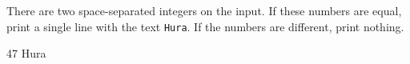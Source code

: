 




There are two space-separated integers on the input. If these numbers are equal, print a single line with the text \texttt{Hura}. If the numbers are different, print nothing.

 47
\vystup
Hura
\koniec

